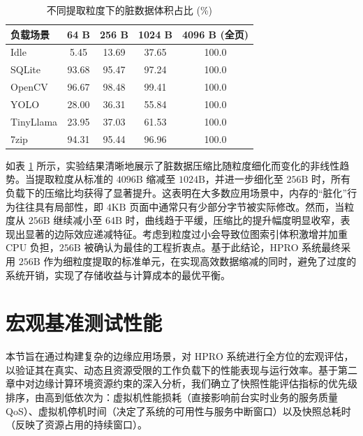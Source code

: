 \begin{table}[htbp]
    \centering
    \caption{不同提取粒度下的脏数据体积占比 (\%)}
    \label{tab:granularity}
    \setlength{\tabcolsep}{10pt} %
    \begin{tabular}{lcccc}
        \toprule
        \textbf{负载场景} & \textbf{64 B} & \textbf{256 B} & \textbf{1024 B} & \textbf{4096 B (全页)} \\
        \midrule
        Idle       & 5.45  & 13.69 & 37.65 & 100.0 \\
        SQLite           & 93.68 & 95.47 & 97.24 & 100.0 \\
        OpenCV           & 96.67 & 98.48 & 99.41 & 100.0 \\
        YOLO             & 28.00 & 36.31 & 55.84 & 100.0 \\
        TinyLlama        & 23.95 & 37.03 & 61.53 & 100.0 \\
        7zip             & 94.31 & 95.44 & 96.96 & 100.0 \\
        \bottomrule
    \end{tabular}
\end{table}

如表 \ref{tab:granularity} 所示，实验结果清晰地展示了脏数据压缩比随粒度细化而变化的非线性趋势。当提取粒度从标准的 $\text{4096B}$ 缩减至 $\text{1024B}$，并进一步细化至 $\text{256B}$ 时，所有负载下的压缩比均获得了显著提升。这表明在大多数应用场景中，内存的“脏化”行为往往具有局部性，即 $\text{4KB}$ 页面中通常只有少部分字节被实际修改。然而，当粒度从 $\text{256B}$ 继续减小至 $\text{64B}$ 时，曲线趋于平缓，压缩比的提升幅度明显收窄，表现出显著的边际效应递减特征。考虑到粒度过小会导致位图索引体积激增并加重 $\text{CPU}$ 负担，$\text{256B}$ 被确认为最佳的工程折衷点。基于此结论，$\text{HPRO}$ 系统最终采用 $\text{256B}$ 作为细粒度提取的标准单元，在实现高效数据缩减的同时，避免了过度的系统开销，实现了存储收益与计算成本的最优平衡。

\section{宏观基准测试性能}

本节旨在通过构建复杂的边缘应用场景，对 $\text{HPRO}$ 系统进行全方位的宏观评估，以验证其在真实、动态且资源受限的工作负载下的性能表现与运行效率。基于第二章中对边缘计算环境资源约束的深入分析，我们确立了快照性能评估指标的优先级排序，由高到低依次为：虚拟机性能损耗（直接影响前台实时业务的服务质量 QoS）、虚拟机停机时间（决定了系统的可用性与服务中断窗口）以及快照总耗时（反映了资源占用的持续窗口）。

